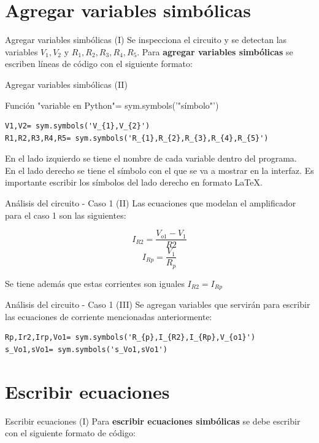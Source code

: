 \documentclass[14pt, aspectratio= 169]{beamer}
\begin{document}
\section{Agregar variables simbólicas}
\begin{frame}{Agregar variables simbólicas (I)}
Se inspecciona el circuito y se detectan las variables $V_{1}, V_{2}$ y $R_{1}, R_{2}, R_{3}, R_{4}, R_{5}$. Para \textbf{agregar variables simbólicas} se escriben líneas de código con el siguiente formato:
\end{frame}

\begin{frame}[fragile]{Agregar variables simbólicas (II)}
\begin{block}{Función}
"variable en Python"= sym.symbols('"símbolo"')
\end{block}
\begin{lstlisting}[style=python]
V1,V2= sym.symbols('V_{1},V_{2}')
R1,R2,R3,R4,R5= sym.symbols('R_{1},R_{2},R_{3},R_{4},R_{5}')
\end{lstlisting}
En el lado izquierdo se tiene el nombre de cada variable dentro del programa. \\
En el lado derecho se tiene el símbolo con el que se va a mostrar en la interfaz.
Es importante escribir los símbolos del lado derecho en formato LaTeX.
\end{frame}


\begin{frame}{Análisis del circuito - Caso 1 (II)}
Las ecuaciones que modelan el amplificador para el caso 1 son las siguientes:

$$I_{R2}= \frac{V_{o1}-V_{1}}{R2}$$ 
$$I_{Rp}= \frac{V_{1}}{R_{p}}$$

Se tiene además que estas corrientes son iguales $I_{R2}=I_{Rp}$

\end{frame}

\begin{frame}[fragile]{Análisis del circuito - Caso 1 (III)}
Se agregan variables que servirán para escribir las ecuaciones de corriente mencionadas anteriormente:
\begin{lstlisting}[style=python]
Rp,Ir2,Irp,Vo1= sym.symbols('R_{p},I_{R2},I_{Rp},V_{o1}')
s_Vo1,sVo1= sym.symbols('s_Vo1,sVo1')
\end{lstlisting}
\end{frame}


\section{Escribir ecuaciones}
\begin{frame}[fragile]{Escribir ecuaciones (I)}
Para \textbf{escribir ecuaciones simbólicas} se debe escribir con el siguiente formato de código: 
\end{frame}
\end{document}

